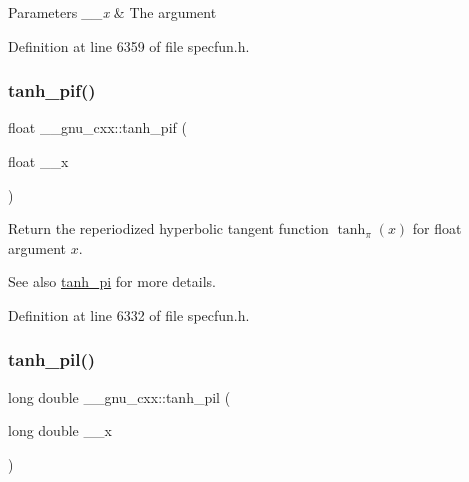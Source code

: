 \begin{DoxyParams}{Parameters}
{\em \+\_\+\+\_\+x} & The argument \\
\hline
\end{DoxyParams}


Definition at line 6359 of file specfun.\+h.

\mbox{\label{group__gnu__math__spec__func_gab6cbfb582127f997ad9a198903d08889}} 
\subsubsection{\texorpdfstring{tanh\+\_\+pif()}{tanh\_pif()}}
{\footnotesize\ttfamily float \+\_\+\+\_\+gnu\+\_\+cxx\+::tanh\+\_\+pif (\begin{DoxyParamCaption}\item[{float}]{\+\_\+\+\_\+x }\end{DoxyParamCaption})\hspace{0.3cm}{\ttfamily [inline]}}

Return the reperiodized hyperbolic tangent function $ \tanh_\pi(x) $ for {\ttfamily float} argument $ x $.

\begin{DoxySeeAlso}{See also}
\hyperlink{group__gnu__math__spec__func_ga8729ffd5acf3266315e9dac1b5a9b3a6}{tanh\+\_\+pi} for more details. 
\end{DoxySeeAlso}


Definition at line 6332 of file specfun.\+h.

\mbox{\label{group__gnu__math__spec__func_ga4bc71ee5cf3df2ba35e6504027e5c6c6}} 
\subsubsection{\texorpdfstring{tanh\+\_\+pil()}{tanh\_pil()}}
{\footnotesize\ttfamily long double \+\_\+\+\_\+gnu\+\_\+cxx\+::tanh\+\_\+pil (\begin{DoxyParamCaption}\item[{long double}]{\+\_\+\+\_\+x }\end{DoxyParamCaption})\hspace{0.3cm}{\ttfamily [inline]}}

